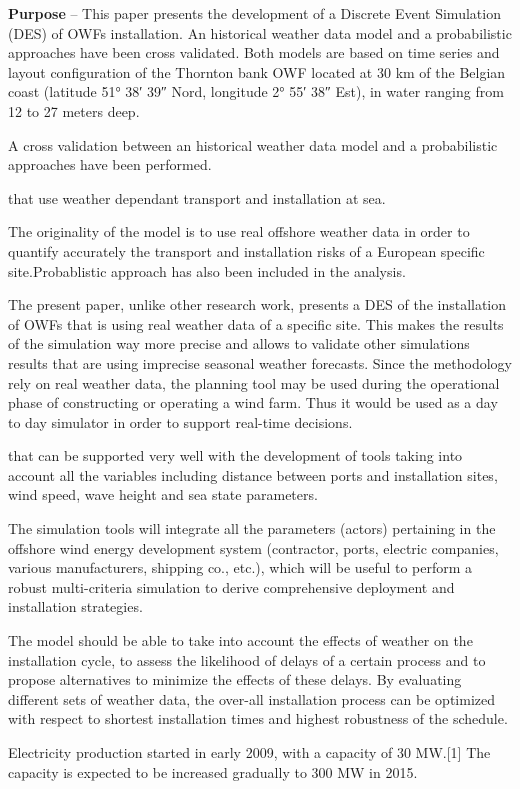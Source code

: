 \textbf{Purpose} --
This paper presents the development of a Discrete Event Simulation (DES) of OWFs installation. An historical weather data model and a probabilistic approaches have been cross validated. Both models are based on time series and layout configuration of the Thornton bank OWF located at 30 km of the Belgian coast (latitude 51° 38′ 39″ Nord, longitude 2° 55′ 38″ Est), in water ranging from 12 to 27 meters deep.

A cross validation between an historical weather data model and a probabilistic approaches have been performed.

that use weather dependant transport and installation at sea. 

The originality of the model is to use real offshore weather data in order to quantify accurately the transport and installation risks of a European specific site.Probablistic approach has also been included in the analysis.


The present paper, unlike other research work, presents a DES of the installation of OWFs that is using real weather data of a specific site. This makes the results of the simulation way more precise and allows to validate other simulations results that are using imprecise seasonal weather forecasts. Since the methodology rely on real weather data, the planning tool may be used during the operational phase of constructing or operating a wind farm. Thus it would be used as a day to day simulator in order to support real-time decisions.

that can be supported very well with the development of tools taking into account all the variables including distance between ports and installation sites, wind speed, wave height and sea state parameters.

The simulation tools will integrate all the parameters (actors) pertaining in the offshore wind energy development system (contractor, ports, electric companies, various manufacturers, shipping co., etc.), which will be useful to perform a robust multi-criteria simulation to derive comprehensive deployment and installation strategies.

The model should be able to take into account the effects of weather on the installation cycle, to assess the likelihood of delays of a certain process and to propose alternatives to minimize the effects of these delays. By evaluating different sets of weather data, the over-all installation process can be optimized with respect to shortest installation times and highest robustness of the schedule.


Electricity production started in early 2009, with a capacity of 30 MW.[1] The capacity is expected to be increased gradually to 300 MW in 2015.